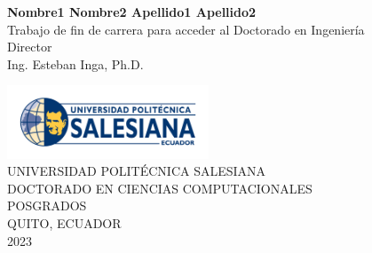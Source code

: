      \begin{center}
         \vskip2cm
         \large\expandafter{\textbf{Nombre1 Nombre2 Apellido1 Apellido2}}  \\
         \vfill
         \normalsize Trabajo de fin de carrera para acceder al Doctorado en Ingeniería\\
         \vskip1cm
         \normalsize Director\\
         \vskip0.3cm
         \normalsize Ing. Esteban Inga, Ph.D. \\
     \end{center}
     \vfill
    \begin{center}
        \includegraphics[width=6cm]{logoups.png}\\
        \uppercase\expandafter{Universidad Politécnica Salesiana} \\
        \uppercase\expandafter{DOCTORADO EN CIENCIAS COMPUTACIONALES} \\
        \uppercase\expandafter{Posgrados} \\
        \uppercase\expandafter{Quito, Ecuador} \\
        \uppercase\expandafter{2023}
    \end{center}






